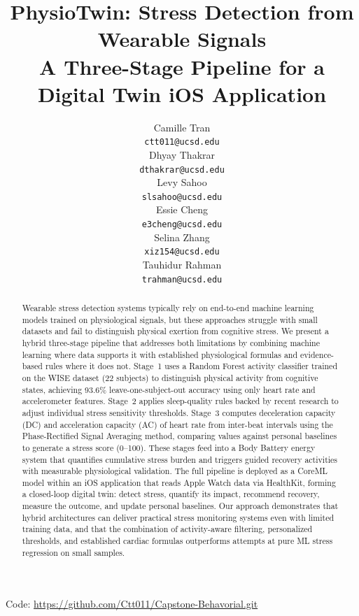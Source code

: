 \documentclass[12pt,letterpaper]{article}
\title{PhysioTwin: Stress Detection from Wearable Signals \\
A Three-Stage Pipeline for a Digital Twin iOS Application}
\author{Camille Tran \\
  {\tt ctt011@ucsd.edu} \\\And
  Dhyay Thakrar \\
  {\tt dthakrar@ucsd.edu} \\\And
  Levy Sahoo \\
  {\tt slsahoo@ucsd.edu} \\\And
  Essie Cheng \\
  {\tt e3cheng@ucsd.edu} \\\And
  Selina Zhang \\
  {\tt xiz154@ucsd.edu} \\\And
  Tauhidur Rahman \\
  {\tt trahman@ucsd.edu} \\}
\begin{document}
\maketitle


\begin{abstract}
Wearable stress detection systems typically rely on end-to-end machine learning models trained on physiological signals, but these approaches struggle with small datasets and fail to distinguish physical exertion from cognitive stress. We present a hybrid three-stage pipeline that addresses both limitations by combining machine learning where data supports it with established physiological formulas and evidence-based rules where it does not. Stage~1 uses a Random Forest activity classifier trained on the WISE dataset (22 subjects) to distinguish physical activity from cognitive states, achieving 93.6\% leave-one-subject-out accuracy using only heart rate and accelerometer features. Stage~2 applies sleep-quality rules backed by recent research to adjust individual stress sensitivity thresholds. Stage~3 computes deceleration capacity (DC) and acceleration capacity (AC) of heart rate from inter-beat intervals using the Phase-Rectified Signal Averaging method, comparing values against personal baselines to generate a stress score (0--100). These stages feed into a Body Battery energy system that quantifies cumulative stress burden and triggers guided recovery activities with measurable physiological validation. The full pipeline is deployed as a CoreML model within an iOS application that reads Apple Watch data via HealthKit, forming a closed-loop digital twin: detect stress, quantify its impact, recommend recovery, measure the outcome, and update personal baselines. Our approach demonstrates that hybrid architectures can deliver practical stress monitoring systems even with limited training data, and that the combination of activity-aware filtering, personalized thresholds, and established cardiac formulas outperforms attempts at pure ML stress regression on small samples.
\end{abstract}

\begin{center}
Code: \url{https://github.com/Ctt011/Capstone-Behavorial.git}
\end{center}

\clearpage
\maketoc
\end{document}
